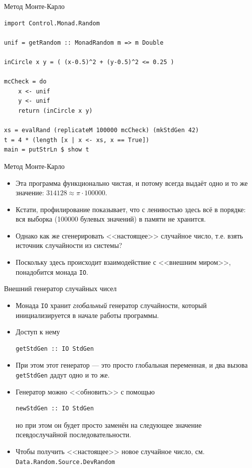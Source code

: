 \documentclass[xcolor=dvipsnames]{beamer}
\begin{document}
\begin{frame}[fragile]{Метод Монте-Карло}

\begin{verbatim}
import Control.Monad.Random

unif = getRandom :: MonadRandom m => m Double

inCircle x y = ( (x-0.5)^2 + (y-0.5)^2 <= 0.25 )

mcCheck = do
    x <- unif
    y <- unif
    return (inCircle x y)

xs = evalRand (replicateM 100000 mcCheck) (mkStdGen 42)
t = 4 * (length [x | x <- xs, x == True])
main = putStrLn $ show t
\end{verbatim}
\end{frame}

\begin{frame}{Метод Монте-Карло}

\begin{itemize}[<+->]
 \item Эта программа функционально чистая, и потому всегда выдаёт одно и то же значение:
 $314128 \approx \pi \cdot 100000$.
 \item Кстати, профилирование показывает, что с ленивостью здесь всё в порядке: вся выборка (100000 булевых значений) в памяти не хранится.
 \item Однако как же сгенерировать <<настоящее>> случайное число, т.е. взять источник случайности из системы?
 \item Поскольку здесь происходит взаимодействие с <<внешним миром>>, понадобится монада {\tt IO}.
\end{itemize}

 
\end{frame}

\begin{frame}[fragile]{Внешний генератор случайных чисел}
 \begin{itemize}[<+->]
  \item Монада \texttt{IO} хранит {\em глобальный} генератор случайности, который инициализируется в начале работы программы.
  \item Доступ к нему
\begin{verbatim}
getStdGen :: IO StdGen
\end{verbatim}
  \item При этом этот генератор --- это просто глобальная переменная, и два вызова {\tt getStdGen} дадут одно и то же.
  \item Генератор можно <<обновить>> с помощью
\begin{verbatim}
newStdGen :: IO StdGen
\end{verbatim}
  но при этом он будет просто заменён на следующее значение псевдослучайной последовательности.
  \item Чтобы получить <<настоящее>> новое случайное число, см. {\tt Data.Random.Source.DevRandom}
 \end{itemize}

\end{frame}
\end{document}
